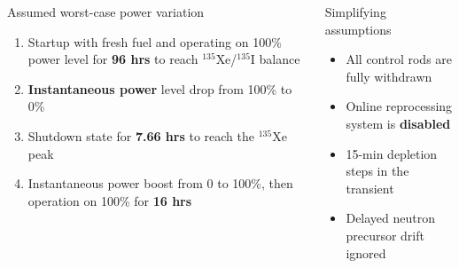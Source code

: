 \begin{frame}
\begin{columns}
	\column[t]{6cm}
	\begin{block}{Assumed worst-case power variation}
		\begin{enumerate}             
			\item Startup with fresh fuel and operating on 100\% power
			level for \textbf{96 hrs} to reach $^{135}$Xe/$^{135}$I balance
			\item \textbf{Instantaneous power} level drop from 100\% to 0\%
			\item Shutdown state for \textbf{7.66 hrs} to reach the 
			$^{135}$Xe peak
			\item Instantaneous power boost from 0 to 100\%, then operation 
			on 100\% for \textbf{16 hrs}
		\end{enumerate}
	\end{block}
			\vspace{-2mm}
	\begin{block}{Simplifying assumptions}
		\begin{itemize}
			\item All control rods are fully withdrawn
			\item Online reprocessing system is \textbf{disabled}
			\item 15-min depletion steps in the transient
			\item Delayed
neutron precursor drift ignored
		\end{itemize}

	\end{block}
\end{columns}
\end{frame}